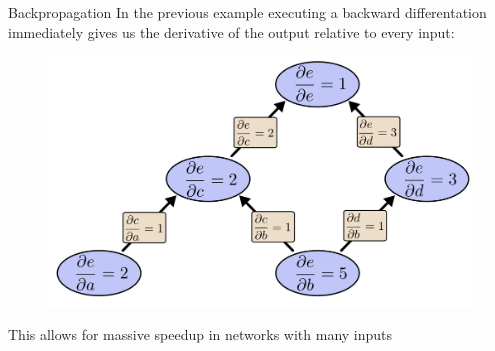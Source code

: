 \documentclass[12pt]{beamer}
\begin{document}
\begin{frame}{Backpropagation}
In the previous example executing a backward differentation immediately gives us the derivative of the output relative to every input:
 

\begin{figure}
\centering
\includegraphics[width = 0.4\linewidth]{images/backprop7.png}
\label{fig:propagation5}
\end{figure}
This allows for massive speedup in networks with many inputs
\end{frame}
\end{document}
